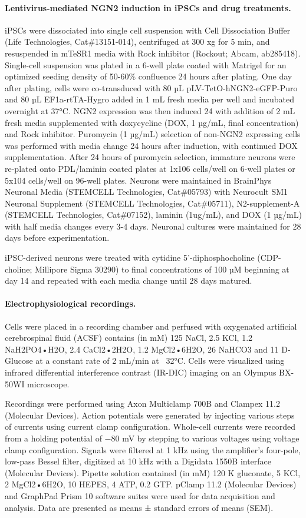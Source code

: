 \paragraph{Lentivirus-mediated NGN2 induction in iPSCs and drug treatments.}
iPSCs were dissociated into single cell suspension with Cell Dissociation Buffer (Life Technologies, Cat\#13151-014), centrifuged at 300 xg for 5 min, and resuspended in mTeSR1 media with Rock inhibitor (Rockout; Abcam, ab285418). Single-cell suspension was plated in a 6-well plate coated with Matrigel for an optimized seeding density of 50-60\% confluence 24 hours after plating. One day after plating, cells were co-transduced with 80 µL pLV-TetO-hNGN2-eGFP-Puro and 80 µL EF1a-rtTA-Hygro added in 1 mL fresh media per well and incubated overnight at 37°C. NGN2 expression was then induced 24 with addition of 2 mL fresh media supplemented with doxycycline (DOX, 1 µg/mL, final concentration) and Rock inhibitor. Puromycin (1 µg/mL) selection of non-NGN2 expressing cells was performed with media change 24 hours after induction, with continued DOX supplementation. After 24 hours of puromycin selection, immature neurons were re-plated onto PDL/laminin coated plates at 1x106 cells/well on 6-well plates or 5x104 cells/well on 96-well plates. Neurons were maintained in BrainPhys Neuronal Media (STEMCELL Technologies, Cat\#05793) with Neurocult SM1 Neuronal Supplement (STEMCELL Technologies, Cat\#05711), N2-supplement-A (STEMCELL Technologies, Cat\#07152), laminin (1ug/mL), and DOX (1 µg/mL) with half media changes every 3-4 days. Neuronal cultures were maintained for 28 days before experimentation.

iPSC-derived neurons were treated with cytidine 5’-diphosphocholine (CDP-choline; Millipore Sigma 30290) to final concentrations of 100 µM beginning at day 14 and repeated with each media change until 28 days matured.

\paragraph{Electrophysiological recordings.}
Cells were placed in a recording chamber and perfused with oxygenated artificial cerebrospinal fluid (ACSF) contains (in mM) 125 NaCl, 2.5 KCl, 1.2 NaH2PO4•H2O, 2.4 CaCl2•2H2O, 1.2 MgCl2•6H2O, 26 NaHCO3 and 11 D-Glucose at a constant rate of 2 mL/min at ~32°C. Cells were visualized using infrared differential interference contrast (IR-DIC) imaging on an Olympus BX-50WI microscope.

Recordings were performed using Axon Multiclamp 700B and Clampex 11.2 (Molecular Devices). Action potentials were generated by injecting various steps of currents using current clamp configuration.  Whole-cell currents were recorded from a holding potential of −80 mV by stepping to various voltages using voltage clamp configuration. Signals were filtered at 1 kHz using the amplifier’s four-pole, low-pass Bessel filter, digitized at 10 kHz with a Digidata 1550B interface (Molecular Devices). Pipette solution contained (in mM) 120 K gluconate, 5 KCl, 2 MgCl2•6H2O, 10 HEPES, 4 ATP, 0.2 GTP. pClamp 11.2 (Molecular Devices) and GraphPad Prism 10 software suites were used for data acquisition and analysis. Data are presented as means ± standard errors of means (SEM).

